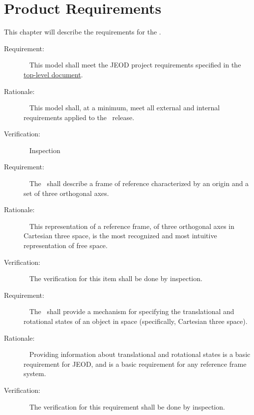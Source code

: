 \chapter{Product Requirements}\label{ch:reqt}

This chapter will describe the requirements for the .

\label{reqt:toplevel}
\begin{description}
\item[Requirement:]\ \newline
  This model shall meet the JEOD project requirements specified in
  the \JEODid\
  \hyperref{file:\JEODHOME/docs/JEOD.pdf}{part1}{reqt}{ top-level
  document}.
\item[Rationale:]\ \newline
  This model shall, at a minimum,  meet all external and internal requirements
  applied to the \JEODid\ release.
\item[Verification:]\ \newline
     Inspection
\end{description}

\label{reqt:refframe_rep}
\begin{description}
\item[Requirement:]\ \newline
The \ shall describe a frame of reference characterized
by an origin and a set of three orthogonal axes.
\item[Rationale:]\ \newline
This representation of a reference frame, of three orthogonal axes in
Cartesian three space, is the most recognized and most intuitive representation
of free space.
\item[Verification:]\ \newline
The verification for this item shall be done by inspection.
\end{description}

\label{reqt:refframe_state}
\begin{description}
\item[Requirement:]\ \newline
The \ shall provide a mechanism for specifying the
translational and rotational states of an object in space (specifically,
Cartesian three space).
\item[Rationale:]\ \newline
Providing information about translational and rotational states is a
basic requirement for JEOD, and is a basic requirement for any reference
frame system.
\item[Verification:]\ \newline
The verification for this requirement shall be done by inspection.
\end{description}

